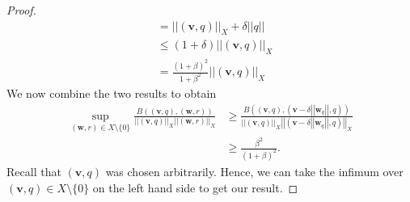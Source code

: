 \documentclass[12pt,a4paper]{article}
\theoremstyle{definition}
\begin{document}
\begin{proof}
\begin{equation}
\begin{aligned}
&=\left|\left|\left(\textbf{v},q\right)\right|\right|_X + \delta\left|\left|q\right|\right|\\
&\leq\left(1+\delta\right)\left|\left|\left(\textbf{v},q\right)\right|\right|_X \\
&=\frac{\left(1+\beta\right)^2}{1+\beta^2}\left|\left|\left(\textbf{v},q\right)\right|\right|_X 
\end{aligned}
\end{equation}
We now combine the two results to obtain
\begin{equation}
\begin{aligned}\nonumber
\sup_{\left(\textbf{w},r\right) \in X\setminus \lbrace0\rbrace}\frac{B\left(\left(\textbf{v},q\right),\left(\textbf{w},r\right)\right)}{\left|\left|\left(\textbf{v},q\right)\right|\right|_X\left|\left|\left(\textbf{w},r\right)\right|\right|_X}&\geq \frac{B\left(\left(\textbf{v},q\right),\left(\textbf{v}-\delta\left|\left|\textbf{w}_q\right|\right|,q\right)\right)}{\left|\left|\left(\textbf{v},q\right)\right|\right|_X\left|\left|\left(\textbf{v}-\delta\left|\left|\textbf{w}_q\right|\right|,q\right)\right|\right|_X}\\
&\geq \frac{\beta^2}{\left(1+\beta\right)^2}.
\end{aligned}
\end{equation}
Recall that $\left(\textbf{v},q\right)$ was chosen arbitrarily.  Hence, we can take the infimum over $\left(\textbf{v},q\right)\in X\setminus\lbrace 0 \rbrace$ on the left hand side to get our result. 
\end{proof}
\end{document}
